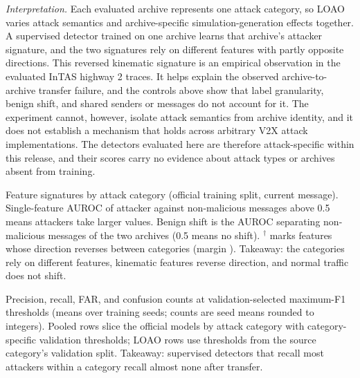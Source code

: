 \documentclass[preprint,12pt,numafflabel]{elsarticle}
\begin{document}
\emph{Interpretation.} Each evaluated archive represents one attack category, so LOAO varies attack semantics and archive-specific simulation-generation effects together. A supervised detector trained on one archive learns that archive's attacker signature, and the two signatures rely on different features with partly opposite directions. This reversed kinematic signature is an empirical observation in the evaluated InTAS highway 2 traces. It helps explain the observed archive-to-archive transfer failure, and the controls above show that label granularity, benign shift, and shared senders or messages do not account for it. The experiment cannot, however, isolate attack semantics from archive identity, and it does not establish a mechanism that holds across arbitrary V2X attack implementations. The detectors evaluated here are therefore attack-specific within this release, and their scores carry no evidence about attack types or archives absent from training.

\begin{table}
\centering
\caption{Feature signatures by attack category (official training split, current message). Single-feature AUROC of attacker against non-malicious messages above 0.5 means attackers take larger values. Benign shift is the AUROC separating non-malicious messages of the two archives (0.5 means no shift). $^\dagger$ marks features whose direction reverses between categories (margin \ResFeatMargin). Takeaway: the categories rely on different features, \ResFeatReversedCount{} kinematic features reverse direction, and normal traffic does not shift.}
\label{tab:features}
{\footnotesize
\begin{adjustbox}{max width=\textwidth}

\end{adjustbox}}
\end{table}

\begin{table}
\centering
\caption{Precision, recall, FAR, and confusion counts at validation-selected maximum-F1 thresholds (means over \ResSeeds{} training seeds; counts are seed means rounded to integers). Pooled rows slice the official models by attack category with category-specific validation thresholds; LOAO rows use thresholds from the source category's validation split. Takeaway: supervised detectors that recall most attackers within a category recall almost none after transfer.}
\label{tab:confusion}
{\scriptsize}
\end{table}
\end{document}
